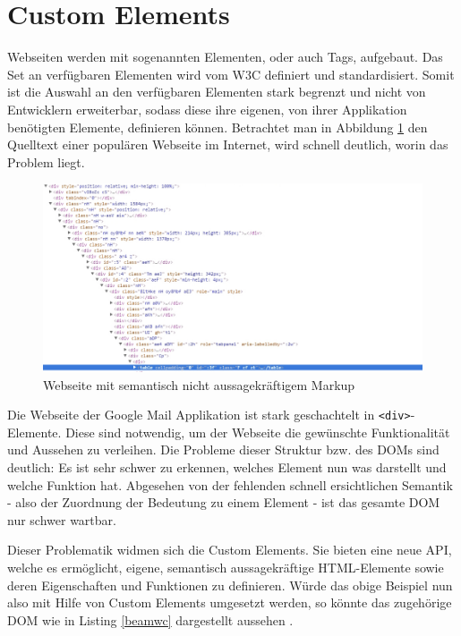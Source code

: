 \section{Custom Elements}\label{custom-elements}

Webseiten werden mit sogenannten Elementen, oder auch Tags, aufgebaut. Das Set an verfügbaren Elementen wird vom \ac{W3C} definiert und standardisiert. Somit ist die Auswahl an den verfügbaren Elementen stark begrenzt und nicht von Entwicklern erweiterbar, sodass diese ihre eigenen, von ihrer Applikation benötigten Elemente, definieren können. Betrachtet man in Abbildung \ref{fig:cusel} den Quelltext einer populären Webseite im Internet, wird schnell deutlich, worin das Problem liegt.

\begin{figure}[htbp]
 \centering
 \includegraphics[width=\linewidth]{kapitel2/bilder/2-custom-elements-div-suppe}
 \caption{Webseite mit semantisch nicht aussagekräftigem Markup}
 \label{fig:cusel}
\end{figure}

Die Webseite der Google Mail Applikation ist stark geschachtelt in \texttt{\textless{}div\textgreater{}}-Elemente. Diese sind notwendig, um der Webseite die gewünschte Funktionalität und Aussehen zu verleihen. Die Probleme dieser Struktur bzw. des \ac{DOM}s sind deutlich: Es ist sehr schwer zu erkennen, welches Element nun was darstellt und welche Funktion hat. Abgesehen von der fehlenden schnell ersichtlichen Semantik - also der Zuordnung der Bedeutung zu einem Element - ist das gesamte \ac{DOM} nur schwer wartbar.

Dieser Problematik widmen sich die Custom Elements. Sie bieten eine neue \ac{API}, welche es ermöglicht, eigene, semantisch aussagekräftige \ac{HTML}-Elemente sowie deren Eigenschaften und Funktionen zu definieren. Würde das obige Beispiel nun also mit Hilfe von Custom Elements umgesetzt werden, so könnte das zugehörige \ac{DOM} wie in Listing \ref{beamwc} dargestellt aussehen \cite{citeulike:13844982}.

